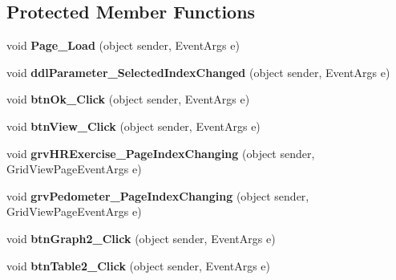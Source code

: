 \subsection*{Protected Member Functions}
\begin{DoxyCompactItemize}
\item 
\hypertarget{classusertrackothers__fitness_aefebed1eedc59a756ee784d1b8a2f63e}{void {\bfseries Page\-\_\-\-Load} (object sender, Event\-Args e)}\label{classusertrackothers__fitness_aefebed1eedc59a756ee784d1b8a2f63e}

\item 
\hypertarget{classusertrackothers__fitness_a538d3aac1584cca297802127a95e028a}{void {\bfseries ddl\-Parameter\-\_\-\-Selected\-Index\-Changed} (object sender, Event\-Args e)}\label{classusertrackothers__fitness_a538d3aac1584cca297802127a95e028a}

\item 
\hypertarget{classusertrackothers__fitness_ab4b51c4c07eb19c7a18c65400a1c0138}{void {\bfseries btn\-Ok\-\_\-\-Click} (object sender, Event\-Args e)}\label{classusertrackothers__fitness_ab4b51c4c07eb19c7a18c65400a1c0138}

\item 
\hypertarget{classusertrackothers__fitness_a9e264049e4736c8016223a882b75ba3b}{void {\bfseries btn\-View\-\_\-\-Click} (object sender, Event\-Args e)}\label{classusertrackothers__fitness_a9e264049e4736c8016223a882b75ba3b}

\item 
\hypertarget{classusertrackothers__fitness_a4080a1003bd3fa24ecba2b1a15a106fd}{void {\bfseries grv\-H\-R\-Exercise\-\_\-\-Page\-Index\-Changing} (object sender, Grid\-View\-Page\-Event\-Args e)}\label{classusertrackothers__fitness_a4080a1003bd3fa24ecba2b1a15a106fd}

\item 
\hypertarget{classusertrackothers__fitness_ada1230a49bcf526ffb1a7169820a9908}{void {\bfseries grv\-Pedometer\-\_\-\-Page\-Index\-Changing} (object sender, Grid\-View\-Page\-Event\-Args e)}\label{classusertrackothers__fitness_ada1230a49bcf526ffb1a7169820a9908}

\item 
\hypertarget{classusertrackothers__fitness_abd0c2e6e04c8520a70ad35689128d65c}{void {\bfseries btn\-Graph2\-\_\-\-Click} (object sender, Event\-Args e)}\label{classusertrackothers__fitness_abd0c2e6e04c8520a70ad35689128d65c}

\item 
\hypertarget{classusertrackothers__fitness_a5c00c7812d7f4272891a55f557b5a29d}{void {\bfseries btn\-Table2\-\_\-\-Click} (object sender, Event\-Args e)}\label{classusertrackothers__fitness_a5c00c7812d7f4272891a55f557b5a29d}


\end{DoxyCompactItemize}
